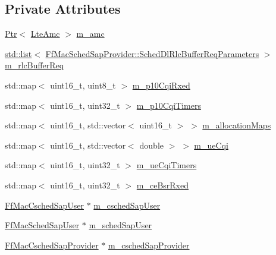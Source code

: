\subsection*{Private Attributes}
\begin{DoxyCompactItemize}
\item 
\hyperlink{classns3_1_1Ptr}{Ptr}$<$ \hyperlink{classns3_1_1LteAmc}{Lte\+Amc} $>$ \hyperlink{classns3_1_1RrFfMacScheduler_ad4ff8c2f667affc956f298199d8c8fa5}{m\+\_\+amc}
\item 
\hyperlink{openflow-interface_8h_afd9bcfa176617760671b67580f536fa7}{std\+::list}$<$ \hyperlink{structns3_1_1FfMacSchedSapProvider_1_1SchedDlRlcBufferReqParameters}{Ff\+Mac\+Sched\+Sap\+Provider\+::\+Sched\+Dl\+Rlc\+Buffer\+Req\+Parameters} $>$ \hyperlink{classns3_1_1RrFfMacScheduler_a25a4bfbb928e22dc026209de004b90fd}{m\+\_\+rlc\+Buffer\+Req}
\item 
std\+::map$<$ uint16\+\_\+t, uint8\+\_\+t $>$ \hyperlink{classns3_1_1RrFfMacScheduler_aabdb8d68324faae8a279df6378d589b7}{m\+\_\+p10\+Cqi\+Rxed}
\item 
std\+::map$<$ uint16\+\_\+t, uint32\+\_\+t $>$ \hyperlink{classns3_1_1RrFfMacScheduler_a1c5527d9b000ec9f4998595b47d54ad2}{m\+\_\+p10\+Cqi\+Timers}
\item 
std\+::map$<$ uint16\+\_\+t, std\+::vector$<$ uint16\+\_\+t $>$ $>$ \hyperlink{classns3_1_1RrFfMacScheduler_a9554a5b41b05461bdbcd12dcdecb34ea}{m\+\_\+allocation\+Maps}
\item 
std\+::map$<$ uint16\+\_\+t, std\+::vector$<$ double $>$ $>$ \hyperlink{classns3_1_1RrFfMacScheduler_aa19c6b6aafe91b47dbd96017fc913b40}{m\+\_\+ue\+Cqi}
\item 
std\+::map$<$ uint16\+\_\+t, uint32\+\_\+t $>$ \hyperlink{classns3_1_1RrFfMacScheduler_a348744ac7d5fc0c7d00d6df7efff37a4}{m\+\_\+ue\+Cqi\+Timers}
\item 
std\+::map$<$ uint16\+\_\+t, uint32\+\_\+t $>$ \hyperlink{classns3_1_1RrFfMacScheduler_a1696bc07e1fdc0336106223f97b44298}{m\+\_\+ce\+Bsr\+Rxed}
\item 
\hyperlink{classns3_1_1FfMacCschedSapUser}{Ff\+Mac\+Csched\+Sap\+User} $\ast$ \hyperlink{classns3_1_1RrFfMacScheduler_a9e706d2beb8b9fe6a376c2be75c2e303}{m\+\_\+csched\+Sap\+User}
\item 
\hyperlink{classns3_1_1FfMacSchedSapUser}{Ff\+Mac\+Sched\+Sap\+User} $\ast$ \hyperlink{classns3_1_1RrFfMacScheduler_a1d834e008836f5b748b81d8d3dc5f926}{m\+\_\+sched\+Sap\+User}
\item 
\hyperlink{classns3_1_1FfMacCschedSapProvider}{Ff\+Mac\+Csched\+Sap\+Provider} $\ast$ \hyperlink{classns3_1_1RrFfMacScheduler_ae6ce3afa91bf2a75735f5c6fd284edc4}{m\+\_\+csched\+Sap\+Provider}

\end{DoxyCompactItemize}
